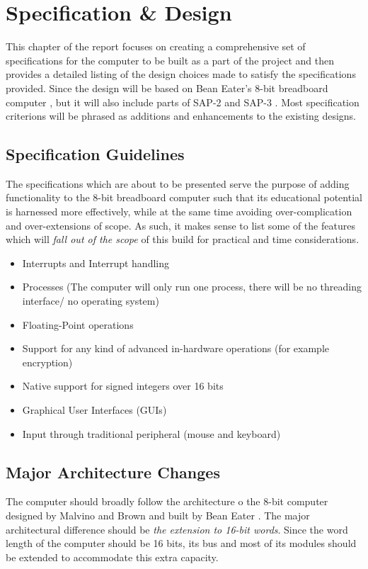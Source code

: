 \chapter{Specification \& Design}
This chapter of the report focuses on creating a comprehensive set of specifications for the computer
to be built as a part of the project and then provides a detailed listing of the design choices made to satisfy
the specifications provided. Since the design will be based on Bean Eater's 8-bit breadboard computer \cite{eater2019breadboard}, but it will also include parts of SAP-2 and SAP-3 \cite{malvino1992digital}. Most specification criterions will be phrased as additions and enhancements to the existing designs.

\section{Specification Guidelines}
The specifications which are about to be presented serve the purpose of adding functionality to the 8-bit breadboard computer such that its educational potential is harnessed more effectively, while at the same time avoiding over-complication and over-extensions of scope. As such, it makes sense to list some of the features which will \emph{fall out of the scope} of this build for practical and time considerations.
\begin{itemize}
  \item Interrupts and Interrupt handling
  \item Processes (The computer will only run one process, there will be no threading interface/ no operating system)
  \item Floating-Point operations
  \item Support for any kind of advanced in-hardware operations (for example encryption)
  \item Native support for signed integers over 16 bits
  \item Graphical User Interfaces (GUIs)
  \item Input through traditional peripheral (mouse and keyboard)
\end{itemize}

\section{Major Architecture Changes}
The computer should broadly follow the architecture o the 8-bit computer designed by Malvino and Brown \cite{malvino1992digital} and built by Bean Eater \cite{eater2019breadboard}. The major architectural difference should be \emph{the extension to 16-bit words}.
Since the word length of the computer should be 16 bits, its bus and most of its modules should be extended to accommodate this extra capacity.

